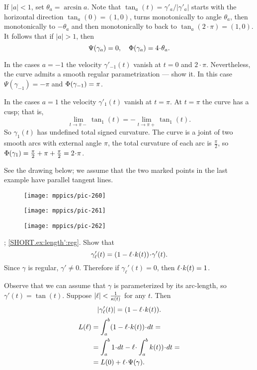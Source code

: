 If $|a|<1$, set $\theta_a=\arcsin a$.
Note that $\tan_a(t)=\gamma'_a/|\gamma'_a|$ starts with the horizontal direction $\tan_a(0)=(1,0)$, turns monotonically to angle $\theta_a$, then monotonically to $-\theta_a$ and then monotonically to back to $\tan_a(2\cdot\pi)=(1,0)$.
It follows that if $|a|>1$, then
\[\Psi(\gamma_a)=0,\quad \tc{\gamma_a}=4\cdot\theta_a.\]

In the cases $a=-1$ the velocity $\gamma'_{-1}(t)$ vanish at $t=0$ and $2\cdot\pi$.
Nevertheless, the curve admits a smooth regular parametrization --- show it.
In this case $\Psi(\gamma_{-1})=-\pi$ and $\Phi({\gamma_{-1}})=\pi$.

In the cases $a=1$ the velocity $\gamma'_1(t)$ vanish at $t=\pi$.
At $t=\pi$ the curve has a cusp;
that is, 
\[\lim_{t\to\pi-}\tan_1(t)=-\lim_{t\to\pi+}\tan_1(t).\]
So $\gamma_1(t)$ has undefined total signed curvature.
The curve is a joint of two smooth arcs with external angle $\pi$,
the total curvature of each arc is $\tfrac\pi2$, so 
$\tc{\gamma_{1}}=\tfrac\pi2+\pi+\tfrac\pi2=2\cdot\pi$.


See the drawing below; we assume that the two marked points in the last example have parallel tangent lines.

\begin{figure}[h!]
\begin{minipage}{.32\textwidth}
\centering
\texttt{[image: mppics/pic-260]}
\end{minipage}\hfill
\begin{minipage}{.32\textwidth}
\centering
\texttt{[image: mppics/pic-261]}
\end{minipage}
\hfill
\begin{minipage}{.32\textwidth}
\centering
\texttt{[image: mppics/pic-262]}
\end{minipage}
\end{figure}

\parbf{\ref{ex:length'}}; \ref{SHORT.ex:length':reg}.
Show that
\[
\gamma_\ell'(t)=(1-\ell\cdot\skur(t))\cdot \gamma'(t).
\]
Since $\gamma$ is regular, $\gamma'\ne0$.
Therefore if $\gamma_\ell'(t)=0$, then $\ell\cdot \skur(t)= 1$.

 Observe that we can assume that $\gamma$ is parameterized by its arc-length, so $\gamma'(t)=\tan(t)$.
Suppose $|\ell|<\frac{1}{\kappa(t)}$ for any $t$.
Then 
\[
|\gamma_\ell'(t)|=(1-\ell\cdot\skur(t)).
\]
\begin{align*}
L(\ell)
&=
\int_a^b(1-\ell\cdot\skur(t))\cdot dt=
\\
&=
\int_a^b 1\cdot dt-\ell\cdot \int_a^b\skur(t))\cdot dt=
\\
&=L(0)+\ell\cdot\Psi(\gamma).
\end{align*}



